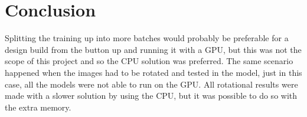 \chapter{Conclusion}
\label{chp:conc}

Splitting the training up into more batches would probably be preferable for a design build from the button up and running it with a GPU, but this was not the scope of this project and so the CPU solution was preferred. The same scenario happened when the images had to be rotated and tested in the model, just in this case, all the models were not able to run on the GPU. All rotational results were made with a slower solution by using the CPU, but it was possible to do so with the extra memory.